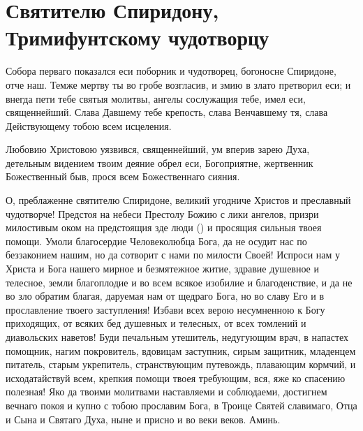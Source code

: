 \section{Святителю Спиридону, Тримифунтскому чудотворцу}\begin{mymulticols}
 


Собора перваго показался еси поборник и чудотворец, богоносне Спиридоне, отче наш. Темже мертву ты во гробе возгласив, и змию в злато претворил еси; и внегда пети тебе святыя молитвы, ангелы сослужащия тебе, имел еси, священнейший. Слава Давшему тебе крепость, слава Венчавшему тя, слава Действующему тобою всем исцеления.


Любовию Христовою уязвився, священнейший, ум вперив зарею Духа, детельным видением твоим деяние обрел еси, Богоприятне, жертвенник Божественный быв, прося всем Божественнаго сияния.


О, преблаженне святителю Спиридоне, великий угодниче Христов и преславный чудотворче! Предстоя на небеси Престолу Божию с лики ангелов, призри милостивым оком на предстоящия зде люди () и просящия сильныя твоея помощи. Умоли благосердие Человеколюбца Бога, да не осудит нас по беззаконием нашим, но да сотворит с нами по милости Своей! Испроси нам у Христа и Бога нашего мирное и безмятежное житие, здравие душевное и телесное, земли благоплодие и во всем всякое изобилие и благоденствие, и да не во зло обратим благая, даруемая нам от щедраго Бога, но во славу Его и в прославление твоего заступления! Избави всех верою несумненною к Богу приходящих, от всяких бед душевных и телесных, от всех томлений и диавольских наветов! Буди печальным утешитель, недугующим врач, в напастех помощник, нагим покровитель, вдовицам заступник, сирым защитник, младенцем питатель, старым укрепитель, странствующим путевождь, плавающим кормчий, и исходатайствуй всем, крепкия помощи твоея требующим, вся, яже ко спасению полезная! Яко да твоими молитвами наставляеми и соблюдаеми, достигнем вечнаго покоя и купно с тобою прославим Бога, в Троице Святей славимаго, Отца и Сына и Святаго Духа, ныне и присно и во веки веков. Аминь.

\end{mymulticols}\newpage

